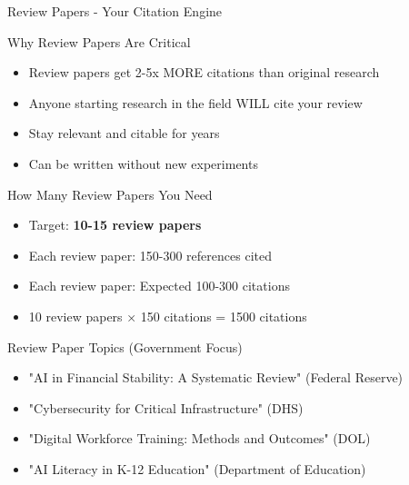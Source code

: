 \documentclass[11pt]{beamer}
\begin{document}
	\begin{frame}{Review Papers - Your Citation Engine}
		\scriptsize
		\begin{block}{Why Review Papers Are Critical}
			\begin{itemize}
				\item Review papers get 2-5x MORE citations than original research
				\item Anyone starting research in the field WILL cite your review
				\item Stay relevant and citable for years
				\item Can be written without new experiments
			\end{itemize}
		\end{block}
		\begin{block}{How Many Review Papers You Need}
			\begin{itemize}
				\item Target: \textbf{10-15 review papers}
				\item Each review paper: 150-300 references cited
				\item Each review paper: Expected 100-300 citations
				\item 10 review papers × 150 citations = 1500 citations
			\end{itemize}
		\end{block}
		\begin{block}{Review Paper Topics (Government Focus)}
			\begin{itemize}
				\item "AI in Financial Stability: A Systematic Review" (Federal Reserve)
				\item "Cybersecurity for Critical Infrastructure" (DHS)
				\item "Digital Workforce Training: Methods and Outcomes" (DOL)
				\item "AI Literacy in K-12 Education" (Department of Education)
			\end{itemize}
		\end{block}
	\end{frame}
	
\end{document}
